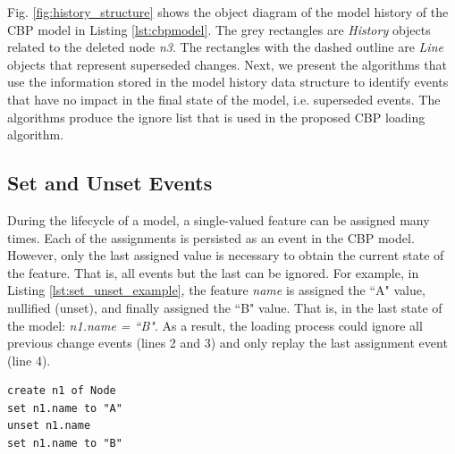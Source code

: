 \documentclass{llncs}
\begin{document}
Fig. \ref{fig:history_structure} shows the object diagram of the model history of the CBP model in Listing \ref{lst:cbpmodel}. The grey rectangles are \emph{History} objects related to the deleted node \emph{n3}. The rectangles with the dashed outline are \emph{Line} objects that represent superseded changes. Next, we present the algorithms that use the information stored in the model history data structure to identify events that have no impact in the final state of the model, i.e. superseded events. The algorithms produce the ignore list that is used in the proposed CBP loading algorithm.

\subsection{Set and Unset Events}
\label{subsec:set_and_unset_events}
During the lifecycle of a model, a single-valued feature can be assigned many times.
Each of the assignments is persisted as an event in the CBP model.
However, only the last assigned value is necessary to obtain the current state of the feature. 
That is, all events but the last can be ignored.
For example, in Listing \ref{lst:set_unset_example}, the feature \emph{name} is assigned the ``A" value, nullified (unset), and finally assigned the ``B" value.
That is, in the last state of the model: \emph{n1.name = ``B"}.
As a result, the loading process could ignore all previous change events (lines 2 and 3) and only replay the last assignment event (line 4). 

\begin{lstlisting}[style=eol,caption={The CBP representation of attribute \emph{name} assignments.},label=lst:set_unset_example]
create n1 of Node
set n1.name to "A"
unset n1.name
set n1.name to "B"
\end{lstlisting}


\end{document}
